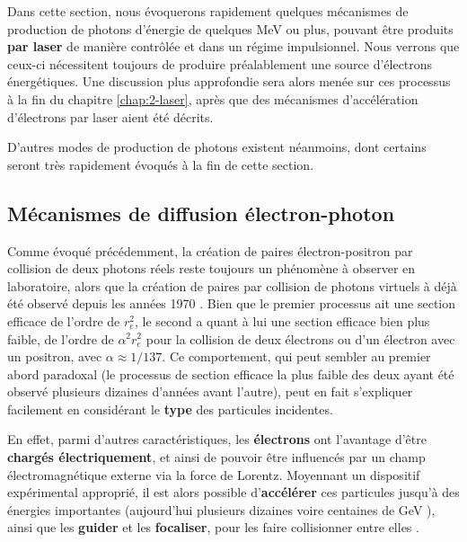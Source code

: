 \begin{refsection}
Dans cette section, nous évoquerons rapidement quelques mécanismes de production de photons d'énergie de quelques MeV ou plus, pouvant être produits \textbf{par laser} de manière contrôlée et dans un régime impulsionnel. Nous verrons que ceux-ci nécessitent toujours de produire préalablement une source d'électrons énergétiques. Une discussion plus approfondie sera alors menée sur ces processus à la fin du chapitre \ref{chap:2-laser}, après que des mécanismes d'accélération d'électrons par laser aient été décrits.

D'autres modes de production de photons existent néanmoins, dont certains seront très rapidement évoqués à la fin de cette section.


\subsection{Mécanismes de diffusion électron-photon}
Comme évoqué précédemment, la création de paires électron-positron par collision de deux photons réels reste toujours un phénomène à observer en laboratoire, alors que la création de paires par collision de photons virtuels à déjà été observé depuis les années 1970 \parencite{budnev_1975}. Bien que le premier processus ait une section efficace de l'ordre de $r_e^2$, le second a quant à lui une section efficace bien plus faible, de l'ordre de $\alpha^2 r_e^2$ pour la collision de deux électrons ou d'un électron avec un positron, avec $\alpha \approx 1/137$. Ce comportement, qui peut sembler au premier abord paradoxal (le processus de section efficace la plus faible des deux ayant été observé plusieurs dizaines d'années avant l'autre), peut en fait s'expliquer facilement en considérant le \textbf{type} des particules incidentes. 

En effet, parmi d'autres caractéristiques, les \textbf{électrons} ont l'avantage d'être \textbf{chargés électriquement}, et ainsi de pouvoir être influencés par un champ électromagnétique externe via la force de Lorentz. Moyennant un dispositif expérimental approprié, il est alors possible d'\textbf{accélérer} ces particules jusqu'à des énergies importantes (aujourd'hui plusieurs dizaines voire centaines de GeV \parencite{zitoun_2009}), ainsi que les \textbf{guider} et les \textbf{focaliser}, pour les faire collisionner entre elles \parencite{zitoun_2009}.


\end{refsection}
